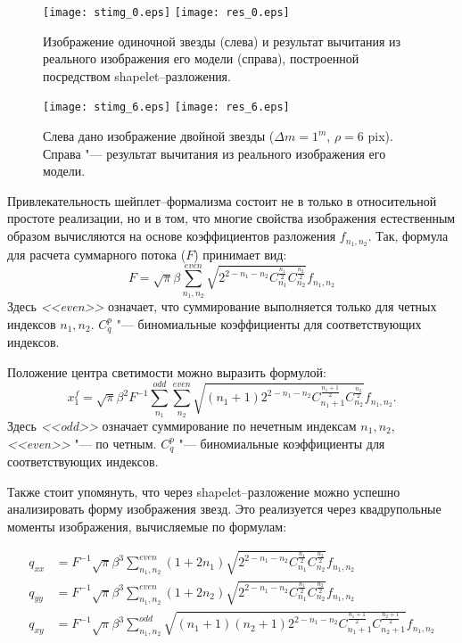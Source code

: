 \begin{figure}
\centering
\texttt{[image: stimg\_0.eps]}
\texttt{[image: res\_0.eps]}
\caption{Изображение одиночной звезды (слева) и результат вычитания из реального изображения его модели (справа), построенной посредством shapelet--разложения.}
\label{fig:model-stars}
\end{figure}

\begin{figure}
\centering
\texttt{[image: stimg\_6.eps]}
\texttt{[image: res\_6.eps]}
\caption{Слева дано изображение двойной звезды ($\Delta m=1^m$, $\rho=6$ pix). Справа "--- результат вычитания из реального изображения его модели.}
\label{fig:model-bin-stars}
\end{figure}

Привлекательность шейплет--формализма состоит не в только в относительной простоте реализации, но и в том, что многие свойства изображения естественным образом вычисляются на основе коэффициентов разложения $f_{n_1,n_2}$. Так, формула для расчета суммарного потока ($F$) принимает вид:
\begin{equation}
\label{eq:SHFlux}
 F = \sqrt{\pi} \beta \sum^{even}_{n_1,n_2} \sqrt{2^{2-n_1-n_2}C^{\frac{n_1}{2}}_{n_1}C^{\frac{n_2}{2}}_{n_2}}f_{n_1,n_2}
\end{equation}
Здесь \textit{<<even>>} означает, что суммирование выполняется только для четных индексов $n_1,n_2$. $C^{p}_{q}$ "--- биномиальные коэффициенты для соответствующих индексов.

Положение центра светимости можно выразить формулой:
\begin{equation}
\label{eq:SHPhCent}
x_1^f = \sqrt{\pi} \beta^2 F^{-1} \sum^{odd}_{n_1}\sum^{even}_{n_2} \sqrt{
(n_1+1)2^{2-n_1-n_2}C^{\frac{n_1+1}{2}}_{n_1+1}C^{\frac{n_2}{2}}_{n_2}}f_{n_1,n_2}.
\end{equation}
Здесь \textit{<<odd>>} означает суммирование по нечетным индексам $n_1,n_2$, \textit{<<even>>} "--- по четным. $C^{p}_{q}$ "--- биномиальные коэффициенты для соответствующих индексов.

Также стоит упомянуть, что через shapelet--разложение можно успешно анализировать форму изображения звезд. Это реализуется через квадрупольные моменты изображения,  вычисляемые по формулам:

\begin{align}\label{moments}
 q_{xx} & = F^{-1} \sqrt{\pi} \beta^3 \sum^{even}_{n_1,n_2} (1+2n_1) \sqrt{2^{2-n_1-n_2}C^{\frac{n_1}{2}}_{n_1}C^{\frac{n_2}{2}}_{n_2}}f_{n_1,n_2} \\
 q_{yy} & = F^{-1} \sqrt{\pi} \beta^3 \sum^{even}_{n_1,n_2} (1+2n_2) \sqrt{2^{2-n_1-n_2}C^{\frac{n_1}{2}}_{n_1}C^{\frac{n_2}{2}}_{n_2}}f_{n_1,n_2} \\
 q_{xy} & = F^{-1} \sqrt{\pi} \beta^3 \sum^{odd}_{n_1,n_2} \sqrt{(n_1+1)(n_2+1)2^{2-n_1-n_2}C^{\frac{n_1+1}{2}}_{n_1+1}C^{\frac{n_2+1}{2}}_{n_2+1}}f_{n_1,n_2}
\end{align}

